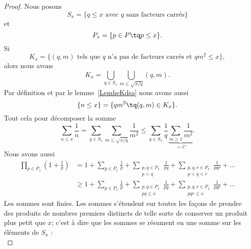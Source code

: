 \begin{proof}
    Nous posons
    \begin{equation}
        S_x=\{  q\leq x\text{ avec } q\text{ sans facteurs carrés} \}
    \end{equation}
    et
    \begin{equation}
        P_x=\{ p\in P\tq p\leq x \}.
    \end{equation}
    Si
    \begin{equation}
        K_x=\{  (q,m)\text{ tels que } q\text{ n'a pas de facteurs carrés et } qm^2\leq x \},
    \end{equation}
    alors nous avons
    \begin{equation}
        K_x=\bigcup_{q\in S_x}\bigcup_{m\leq \sqrt{x/q}}(q,m).
    \end{equation}
    Par définition et par le lemme~\ref{LemheKdsa} nous avons aussi
    \begin{equation}
        \{ n\leq x \}=\{ qm^2\tq (q,m)\in K_x \}.
    \end{equation}
    Tout cela pour décomposer la somme
    \begin{equation}        \label{EqpoJpuC}
        \sum_{n\leq x}\frac{1}{ n }=\sum_{q\in S_x}\sum_{m\leq\sqrt{x/q}}\frac{1}{ m^2 }\leq \sum_{q\in S_x}\frac{1}{ q }\underbrace{\sum_{m\geq 1}\frac{1}{ m^2 }}_{=C}.
    \end{equation}
    Nous avons aussi
    \begin{subequations}
        \begin{align}
            \prod_{p\in P_x}\left( 1+\frac{1}{ p } \right)&=1+\sum_{p\in P_x}\frac{1}{ p }+\sum_{\substack{p,q\in P_x\\p<q}}\frac{1}{ pq }+\sum_{\substack{p,q,r\in P_x\\p<q<r}}\frac{1}{ pqr }+\ldots\\
            &\geq 1+\sum_{p\in P_x}\frac{1}{ p }+\sum_{\substack{p,q\in P_x\\pq\leq x}}\frac{1}{ pq }+\sum_{\substack{p,q,r\in P_x\\pqr\leq x}}\frac{1}{ pqr }+\ldots
        \end{align}
    \end{subequations}
    Les sommes sont finies. Les sommes s'étendent sur toutes les façons de prendre des produits de nombres premiers distincts de telle sorte de conserver un produit plus petit que \( x\); c'est à dire que les sommes se résument en une somme sur les éléments de \( S_x\) :
    \begin{equation}        \label{EqooilOz}

\end{equation}
\end{proof}
